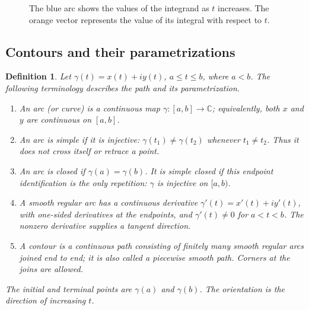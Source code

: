 \documentclass{report}
\newtheorem{definition}{Definition}
\begin{document}
\begin{figure}[H]
    \centering
    \caption{The blue arc shows the values of the integrand as $t$ increases.
    The orange vector represents the value of its integral with respect to $t$.}
    \label{fig:integration-real-parameter}
\end{figure}

\subsection{Contours and their parametrizations}

\begin{definition}
    Let $\gamma(t)=x(t)+iy(t)$, $a\leq t\leq b$, where $a<b$.
    The following terminology describes the path and its parametrization.
    \begin{enumerate}
        \item An \emph{arc} (or curve) is a continuous map
        $\gamma:[a,b]\to\mathbb C$; equivalently, both $x$ and $y$
        are continuous on $[a,b]$.
        \item An arc is \emph{simple} if it is injective:
        $\gamma(t_1)\ne\gamma(t_2)$ whenever $t_1\ne t_2$.
        Thus it does not cross itself or retrace a point.
        \item An arc is \emph{closed} if $\gamma(a)=\gamma(b)$.
        It is \emph{simple closed} if this endpoint identification is
        the only repetition: $\gamma$ is injective on $[a,b)$.
        \item A \emph{smooth regular arc} has a continuous derivative
        $\gamma'(t)=x'(t)+iy'(t)$, with one-sided derivatives at the
        endpoints, and $\gamma'(t)\ne0$ for $a<t<b$.
        The nonzero derivative supplies a tangent direction.
        \item A \emph{contour} is a continuous path consisting of finitely
        many smooth regular arcs joined end to end; it is also called
        a piecewise smooth path. Corners at the joins are allowed.
    \end{enumerate}
    The initial and terminal points are $\gamma(a)$ and $\gamma(b)$.
    The orientation is the direction of increasing $t$.
\end{definition}
\end{document}
